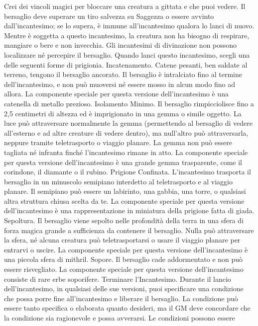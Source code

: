 \begin{multicols}{2}
Crei dei vincoli magici per bloccare una creatura a
gittata e che puoi vedere. Il bersaglio deve superare un
tiro salvezza su Saggezza o essere avvinto
dall’incantesimo; se lo supera, è immune
all’incantesimo qualora lo lanci di nuovo. Mentre è
soggetta a questo incantesimo, la creatura non ha
bisogno di respirare, mangiare o bere e non invecchia.
Gli incantesimi di divinazione non possono localizzare
né percepire il bersaglio.
Quando lanci questo incantesimo, scegli una delle
seguenti forme di prigionia.
Incatenamento. Catene pesanti, ben saldate al
terreno, tengono il bersaglio ancorato. Il bersaglio è
intralciato fino al termine dell’incantesimo, e non può
muoversi né essere mosso in alcun modo fino ad allora.
La componente speciale per questa versione
dell’incantesimo è una catenella di metallo prezioso.
Isolamento Minimo. Il bersaglio rimpicciolisce fino a
2,5 centimetri di altezza ed è imprigionato in una
gemma o simile oggetto. La luce può attraversare
normalmente la gemma (permettendo al bersaglio di
vedere all’esterno e ad altre creature di vedere dentro),
ma null’altro può attraversarla, neppure tramite
teletrasporto o viaggio planare. La gemma non può
essere tagliata né infranta finché l’incantesimo rimane
in atto.
La componente speciale per questa versione
dell’incantesimo è una grande gemma trasparente,
come il corindone, il diamante o il rubino.
Prigione Confinata. L’incantesimo trasporta il
bersaglio in un minuscolo semipiano interdetto al
teletrasporto e al viaggio planare. Il semipiano può
essere un labirinto, una gabbia, una torre, o qualsiasi
altra struttura chiusa scelta da te.
La componente speciale per questa versione
dell’incantesimo è una rappresentazione in miniatura
della prigione fatta di giada.
Sepoltura. Il bersaglio viene sepolto nelle profondità
della terra in una sfera di forza magica grande a
sufficienza da
contenere il bersaglio. Nulla può attraversare la sfera,
né alcuna creatura può teletrasportarsi o usare il
viaggio planare per entrarvi o uscire.
La componente speciale per questa versione
dell’incantesimo è una piccola sfera di mithril.
Sopore. Il bersaglio cade addormentato e non può
essere risvegliato. La componente speciale per questa
versione dell’incantesimo consiste di rare erbe
soporifere.
Terminare l’Incantesimo. Durante il lancio
dell’incantesimo, in qualsiasi delle sue versioni, puoi
specificare una condizione che possa porre fine
all’incantesimo e liberare il bersaglio. La condizione può
essere tanto specifica o elaborata quanto desideri, ma il
GM deve concordare che la condizione sia ragionevole
e possa avverarsi. Le condizioni possono essere

\end{multicols}

